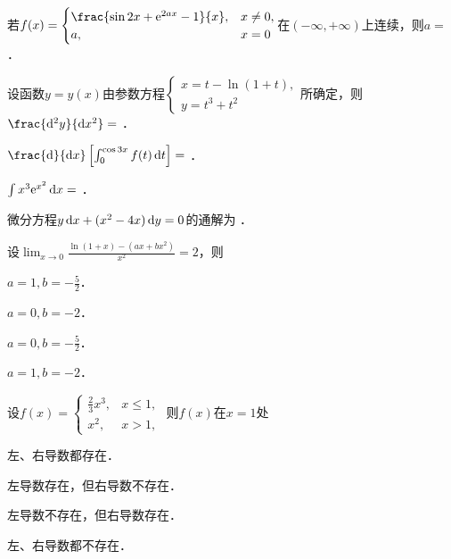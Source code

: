 \documentclass[plain,noanswer,medmath]{../../template/jnuexam}
\begin{document}






\begin{problem}
若$f(x) = \begin{cases}
  \frac{\sin 2x + \e^{2ax} - 1}{x}, & x \ne 0, \\
                                 a, & x = 0
\end{cases}$在$(-\infty , +\infty)$上连续，则$a =$ \fillin{}．
\end{problem}


\begin{problem}
设函数$y = y(x)$由参数方程$\begin{cases}
  x = t - \ln(1 + t), \\
  y = t^3 + t^2
\end{cases}$所确定，则$\frac{\d^2 y}{\dx^2} =$ \fillin{}．
\end{problem}


\begin{problem}
$\frac{\d}{\dx}\left[\int_0^{\cos 3x} f(t)\dt \right] =$ \fillin{}．
\end{problem}


\begin{problem}
$\int x^3\mathrm{e}^{x^2} \mathop{}\!\mathrm{d} x =$ \fillin{}．
\end{problem}


\begin{problem}
微分方程$y\mathop{}\!\mathrm{d} x + (x^2 - 4x)\mathop{}\!\mathrm{d} y = 0$的通解为 \fillin{}．
\end{problem}




\begin{problem}
设$\lim_{x \to 0} \frac{\ln(1 + x) - (ax + bx^2)}{x^2} = 2$，则\pickout{}
\begin{abcd}
\item $a = 1,b = - \frac{5}{2}$．		
\item $a = 0,b = - 2$．
\item $a = 0,b = - \frac{5}{2}$．		
\item $a = 1,b = - 2$．
\end{abcd}
\end{problem}


\begin{problem}
设$f(x) = \begin{cases}
  \frac{2}{3}x^3, & x \le 1, \\
             x^2, & x > 1,
\end{cases}$ 则$f(x)$在$x = 1$处\pickout{}
\begin{abcd}
\item 左、右导数都存在．				
\item 左导数存在，但右导数不存在．
\item 左导数不存在，但右导数存在．	
\item 左、右导数都不存在．
\end{abcd}
\end{problem}
\end{document}
